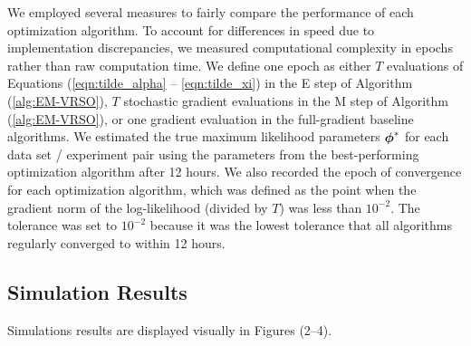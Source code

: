 We employed several measures to fairly compare the performance of each optimization algorithm. To account for differences in speed due to implementation discrepancies, we measured computational complexity in epochs rather than raw computation time. We define one epoch as either $T$ evaluations of Equations (\ref{eqn:tilde_alpha} -- \ref{eqn:tilde_xi}) in the E step of Algorithm (\ref{alg:EM-VRSO}), $T$ stochastic gradient evaluations in the M step of Algorithm (\ref{alg:EM-VRSO}), or one gradient evaluation in the full-gradient baseline algorithms. We estimated the true maximum likelihood parameters $\boldsymbol{\phi}^*$ for each data set / experiment pair using the parameters from the best-performing optimization algorithm after 12 hours. We also recorded the epoch of convergence for each optimization algorithm, which was defined as the point when the gradient norm of the log-likelihood (divided by $T$) was less than $10^{-2}$. The tolerance was set to $10^{-2}$ because it was the lowest tolerance that all algorithms regularly converged to within 12 hours.

\subsection{Simulation Results}

Simulations results are displayed visually in Figures (2--4).

